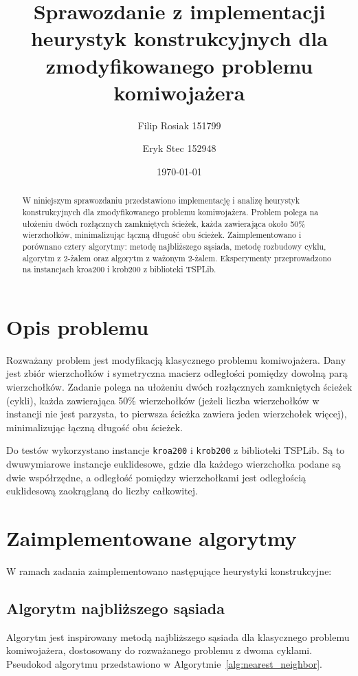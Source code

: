 \documentclass[12pt,a4paper]{article}
\title{Sprawozdanie z implementacji heurystyk konstrukcyjnych dla zmodyfikowanego problemu komiwojażera}
\author{Filip Rosiak 151799  \and Eryk Stec 152948}
\date{\today}
\begin{document}
\maketitle

\begin{abstract}
W niniejszym sprawozdaniu przedstawiono implementację i analizę heurystyk konstrukcyjnych dla zmodyfikowanego problemu komiwojażera. Problem polega na ułożeniu dwóch rozłącznych zamkniętych ścieżek, każda zawierająca około 50\% wierzchołków, minimalizując łączną długość obu ścieżek. Zaimplementowano i porównano cztery algorytmy: metodę najbliższego sąsiada, metodę rozbudowy cyklu, algorytm z 2-żalem oraz algorytm z ważonym 2-żalem. Eksperymenty przeprowadzono na instancjach kroa200 i krob200 z biblioteki TSPLib.
\end{abstract}

\section{Opis problemu}
Rozważany problem jest modyfikacją klasycznego problemu komiwojażera. Dany jest zbiór wierzchołków i symetryczna macierz odległości pomiędzy dowolną parą wierzchołków. Zadanie polega na ułożeniu dwóch rozłącznych zamkniętych ścieżek (cykli), każda zawierająca 50\% wierzchołków (jeżeli liczba wierzchołków w instancji nie jest parzysta, to pierwsza ścieżka zawiera jeden wierzchołek więcej), minimalizując łączną długość obu ścieżek.

Do testów wykorzystano instancje \texttt{kroa200} i \texttt{krob200} z biblioteki TSPLib. Są to dwuwymiarowe instancje euklidesowe, gdzie dla każdego wierzchołka podane są dwie współrzędne, a odległość pomiędzy wierzchołkami jest odległością euklidesową zaokrąglaną do liczby całkowitej.

\section{Zaimplementowane algorytmy}
W ramach zadania zaimplementowano następujące heurystyki konstrukcyjne:

\subsection{Algorytm najbliższego sąsiada}
Algorytm jest inspirowany metodą najbliższego sąsiada dla klasycznego problemu komiwojażera, dostosowany do rozważanego problemu z dwoma cyklami. Pseudokod algorytmu przedstawiono w Algorytmie~\ref{alg:nearest_neighbor}.
\end{document}

